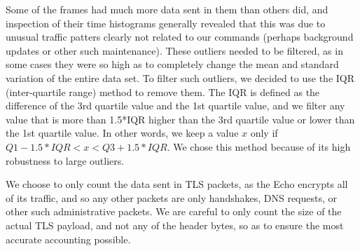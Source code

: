Some of the frames had much more data sent in them than others did, and inspection of their time histograms generally revealed that this was due to unusual traffic patters clearly not related to our commands (perhaps background updates or other such maintenance). These outliers needed to be filtered, as in some cases they were so high as to completely change the mean and standard variation of the entire data set. To filter such outliers, we decided to use the IQR (inter-quartile range) method to remove them. The IQR is defined as the difference of the 3rd quartile value and the 1st quartile value, and we filter any value that is more than 1.5*IQR higher than the 3rd quartile value or lower than the 1st quartile value. In other words, we keep a value $x$ only if $Q1 - 1.5*IQR < x < Q3 + 1.5*IQR$. We chose this method because of its high robustness to large outliers.

We choose to only count the data sent in TLS packets, as the Echo encrypts all of its traffic, and so any other packets are only handshakes, DNS requests, or other such administrative packets. We are careful to only count the size of the actual TLS payload, and not any of the header bytes, so as to ensure the most accurate accounting possible.



